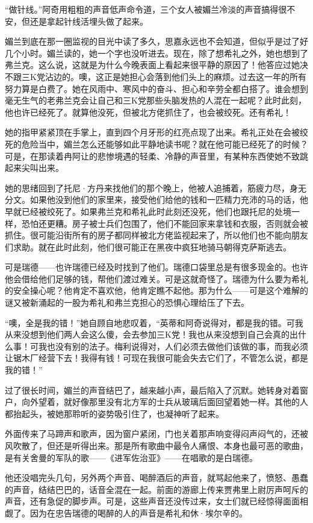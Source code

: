 \par “做针线。”阿奇用粗粗的声音低声命令道，三个女人被媚兰冷淡的声音搞得很不安，但还是拿起针线活埋头做了起来。
\par 媚兰到底在那一圈监视的目光中读了多久，思嘉永远也不会知道，但似乎是过了好几个小时。媚兰读的，她一个字也没听进去。现在，除了想希礼之外，她也想到了弗兰克。这么说，这就是为什么今晚表面上看起来很平静的原因了！他答应过她决不跟三K党沾边的。噢，这正是她担心会落到他们头上的麻烦。过去这一年的所有努力算是白费了。她在风雨中、寒风中的奋斗、担心和辛劳全都白搭了。谁会想到毫无生气的老弗兰克会让自己和三K党那些头脑发热的人混在一起呢？此时此刻，他也许已经死了。就算他没死，但被北方佬抓住了，也会被绞死。还有希礼！
\par 她的指甲紧紧顶在手掌上，直到四个月牙形的红亮点现了出来。希礼正处在会被绞死的危险当中，媚兰怎么还能够如此平静地读书呢？就在他可能已经死了的时候？可是，在那读着冉阿让的悲惨境遇的轻柔、冷静的声音里，有某种东西使她不致跳起来尖叫出来。
\par 她的思绪回到了托尼·方丹来找他们的那个晚上，他被人追捕着，筋疲力尽，身无分文。如果他没到他们的家里来，接受他们给他的钱和一匹精力充沛的马的话，他早就已经被绞死了。如果弗兰克和希礼此时此刻还没死，他们也跟托尼的处境一样，恐怕还更糟。房子被士兵们包围了，他们不能回家来拿钱和衣服，否则就会被抓住。很可能沿街所有的房子都同样被北方佬监视起来了，所以他们也不能向朋友们求助。就在此时此刻，他们很可能正在黑夜中疯狂地骑马朝得克萨斯逃去。
\par 可是瑞德——也许瑞德已经及时找到了他们。瑞德口袋里总是有很多现金的。也许他会借给他们足够的钱，帮他们渡过难关。可是这就奇怪了。瑞德为什么要为希礼的安全操心呢？他肯定不喜欢他，他肯定瞧不起他。那为什么——可是这个难解的谜又被新涌起的一股为希礼和弗兰克担心的恐惧心理给压了下去。
\par “噢，全是我的错！”她自顾自地悲叹着，“英蒂和阿奇说得对，都是我的错。可我从来没想到他们两人会这么傻，会去参加三K党！我也从来没想到自己会真的出什么事！可我也没有别的法子。梅利说得对，人们必须去做他们该做的事，而我必须让锯木厂经营下去！我得有钱！可现在我很可能会失去它们了，不管怎么说，都是我的错！”
\par 过了很长时间，媚兰的声音结巴了，越来越小声，最后陷入了沉默。她转身对着窗户，向外望着，就好像那里没有北方军的士兵从玻璃后面回望着她一样。其他的人都抬起头，被她那聆听的姿势吸引住了，也凝神听了起来。
\par 外面传来了马蹄声和歌声，因为窗户紧闭，门也关着那声响变得闷声闷气的，还被风吹散了，但还是听得出来。那是所有歌曲中最令人痛恨、本身也最可恶的歌曲，是有关舍曼的军队的歌——《进军佐治亚》——在唱歌的是白瑞德。
\par 他还没唱完头几句，另外两个声音、喝醉酒后的声音，就骂起他来了，愤怒、愚蠢的声音，结结巴巴的，话音全混在一起。前面的游廊上传来贾弗里上尉厉声呵斥的声音，还有急促的脚步声。可是，这些声音还没传过来，女士们就已经惊得面面相觑了。因为在忠告瑞德的喝醉的人的声音是希礼和休·埃尔辛的。
